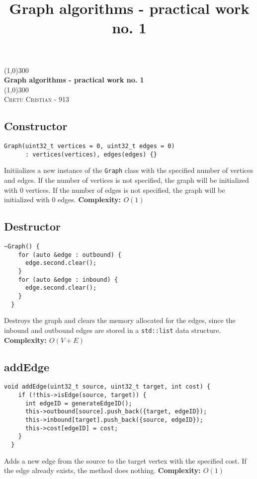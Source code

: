 \documentclass{article}
\title{Graph algorithms - practical work no. 1}
\begin{document}
\begin{titlepage}
	\begin{center}
    \line(1,0){300}\\
    [0.65cm]
	\huge{\bfseries Graph algorithms - practical work no. 1}\\
	\line(1,0){300}\\
	\textsc{\Large Cretu Cristian - 913}\\
	[5.5cm]     
	\end{center}
\end{titlepage}

\subsection*{Constructor}

\begin{verbatim}
Graph(uint32_t vertices = 0, uint32_t edges = 0)
      : vertices(vertices), edges(edges) {}
\end{verbatim}

Initiializes a new instance of the \texttt{Graph} class with the specified number of vertices and edges. If the number of vertices is not specified, the graph will be initialized with 0 vertices. If the number of edges is not specified, the graph will be initialized with 0 edges.
\textbf{Complexity: $O(1)$}


\subsection*{Destructor}

\begin{verbatim}
~Graph() {
    for (auto &edge : outbound) {
      edge.second.clear();
    }
    for (auto &edge : inbound) {
      edge.second.clear();
    }
  }
\end{verbatim}
Destroys the graph and clears the memory allocated for the edges, since the inbound and outbound edges are stored in a \texttt{std::list} data structure.
\textbf{Complexity: $O(V + E)$}

\subsection*{addEdge}

\begin{verbatim}
void addEdge(uint32_t source, uint32_t target, int cost) {
    if (!this->isEdge(source, target)) {
      int edgeID = generateEdgeID();
      this->outbound[source].push_back({target, edgeID});
      this->inbound[target].push_back({source, edgeID});
      this->cost[edgeID] = cost;
    }
  }
\end{verbatim}
Adds a new edge from the source to the target vertex with the specified cost. If the edge already exists, the method does nothing.
\textbf{Complexity: $O(1)$}
\end{document}
